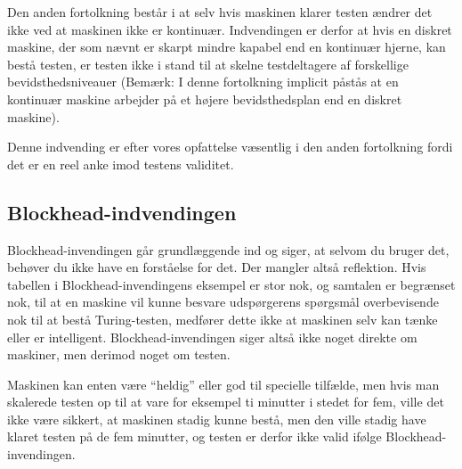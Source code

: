 \documentclass{article}
\begin{document}
Den anden fortolkning består i at selv hvis maskinen klarer testen ændrer det ikke ved at maskinen ikke er kontinuær. Indvendingen er derfor at hvis en diskret maskine, der som nævnt er skarpt mindre kapabel end en kontinuær hjerne, kan bestå testen, er testen ikke i stand til at skelne testdeltagere af forskellige bevidsthedsniveauer (Bemærk: I denne fortolkning implicit påstås at en kontinuær maskine arbejder på et højere bevidsthedsplan end en diskret maskine).

Denne indvending er efter vores opfattelse væsentlig i den anden fortolkning fordi det er en reel anke imod testens validitet.


\subsection{Blockhead-indvendingen}

Blockhead-invendingen går grundlæggende ind og siger, at selvom du bruger det, behøver du ikke have en forståelse for det. Der mangler altså reflektion.
Hvis tabellen i Blockhead-invendingens eksempel er stor nok, og samtalen er begrænset nok, til at en maskine vil kunne besvare udspørgerens spørgsmål overbevisende nok til at bestå Turing-testen, medfører dette ikke at maskinen selv kan tænke eller er intelligent. Blockhead-invendingen siger altså ikke noget direkte om maskiner, men derimod noget om testen.

Maskinen kan enten være ``heldig'' eller god til specielle tilfælde, men hvis man skalerede testen op til at vare for eksempel ti minutter i stedet for fem, ville det ikke være sikkert, at maskinen stadig kunne bestå, men den ville stadig have klaret testen på de fem minutter, og testen er derfor ikke valid ifølge Blockhead-invendingen.
\end{document}
